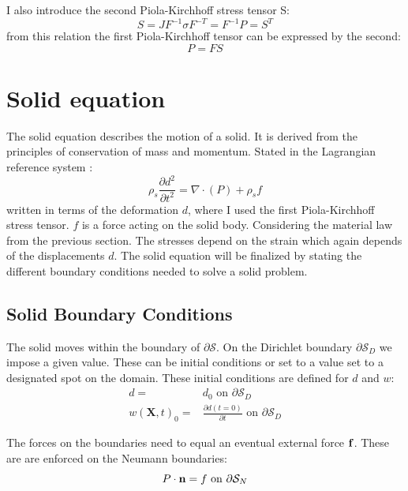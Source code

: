 I also introduce the second Piola-Kirchhoff stress tensor S:
\begin{equation}
S = J F^{-1}\sigma F^{-T} = F^{-1} P = S^T 
\end{equation}
from this relation the first Piola-Kirchhoff tensor can be expressed by the second:
\begin{equation}
P = FS
\end{equation}

\section{Solid equation}
The solid equation describes the motion of a solid. It is derived from the principles of conservation of mass and momentum. Stated in the Lagrangian reference system \cite{Richter2016}:
\begin{equation}\label{eq:Solid}
\rho_s \frac{\partial d^2}{\partial t^2} = \nabla \cdot ( P ) + \rho_s f 
\end{equation}
written in terms of the deformation $d$, where I used the first Piola-Kirchhoff stress tensor. $f$ is a force acting on the solid body. Considering the material law from the previous section. The stresses depend on the strain which again depends of the displacements $d$. The solid equation will be finalized by stating the different boundary conditions needed to solve a solid problem.
\subsection{Solid Boundary Conditions}
The solid moves within the boundary of $ \partial \mathcal{S}$.  On the Dirichlet boundary $ \partial \mathcal{S}_D$ we impose a given value. These can be initial conditions or set to a value set to a designated spot on the domain. These initial conditions are defined for $d$ and $w$:
\begin{align}
d =& d_0 \text{ on   } \partial \mathcal{S}_D  \\
w(\textbf{X},t)_0 =& \frac{\partial d(t=0)}{\partial t} \text{   on   } \partial \mathcal{S}_D   
\end{align}

The forces on the boundaries need to equal an eventual external force $ \bold{f}$. These are are enforced on the Neumann boundaries:
$$ P\cdot \bold{n} = f \text{   on   } \partial \mathcal{S}_N    $$

